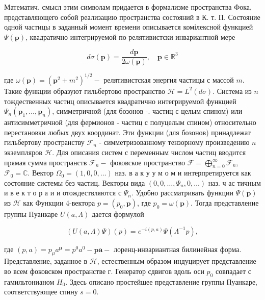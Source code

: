 \documentclass[10pt]{article}
\begin{document}
Математич. смысл этим символам придается в формализме пространства Фока, представляющего собой реализацию пространства состояний в К. т. П. Состояние одной частицы в заданный момент времени описывается комілексной функцией $\Psi(\boldsymbol{p})$, квадратично интегрируемой по релятивистски инвариантной мере



\[

d \sigma(\boldsymbol{p})=\frac{d \boldsymbol{p}}{2 \omega(\boldsymbol{p})}, \quad \boldsymbol{p} \in \mathbb{R}^{3}

\]



где $\omega(\boldsymbol{p})=\left(\boldsymbol{p}^{2}+m^{2}\right)^{1 / 2}-$ релятивистская энергия частицы с массой $m$. Такие функции образуют гильбертово пространство $\mathscr{H}=L^{2}(d \sigma)$. Система из $n$ тождественных частиц описывается квадратично интегрируемой функцией $\Psi_{n}\left(\boldsymbol{p}_{1}, \ldots, \boldsymbol{p}_{n}\right)$, симметричной (для бозонов -. частиц с целым спином) или антисимметричной (для фермионов - частиц с полуцелым спином) относительно перестановки любых двух координат. Эти функции (для бозонов) принадлежат гильбертову пространству $\mathscr{F}_{n}$ - симметризованному тензорному произведению $n$ экземпляров $\mathscr{H}$. Для описания систем с переменным числом частиц вводится прямая сумма пространств $\mathscr{F}_{n}-$ фоковское пространство $\mathscr{F}=\bigoplus_{n=0}^{\infty} \mathscr{F}_{n}$, $\mathscr{F}_{0}=\mathbb{C}$. Вектор $\Omega_{0}=(1,0,0, \ldots)$ наз. в а к у у м о м и интерпретируется как состояние системы без частиц. Векторы вида $\left(0,0, \ldots, \Psi_{n}, 0, \ldots\right)$ наз. ч ас тичным и в е к т о р а и и отождествляются с $\Psi_{n}$. Удобно рассматривать функции $\Psi(\boldsymbol{p})$ из $\mathscr{H}$ как Функции 4-вектора $p=\left(p_{0}, \boldsymbol{p}\right)$, где $p_{0}=\omega(\boldsymbol{p})$. Тогда представление группы Пуанкаре $U(a, \Lambda)$ дается формулой



\[

(U(a, \Lambda) \Psi)(p)=e^{-i(p, a)} \Psi\left(\Lambda^{-1} p\right),

\]



где $(p, a)=p_{\mu} a^{\boldsymbol{\mu}}=p^{0} a^{0}-\boldsymbol{p} \boldsymbol{a}-$ лоренц-инвариантная билинейная форма. Представление, заданное в $\mathscr{H}$, естественным образом индуцирует представление во всем фоковском пространстве г. Генератор сдвигов вдоль оси $p_{0}$ совпадает с гамильтонианом $H_{0}$. Здесь описано простейшее представление группы Пуанкаре, соответствующее спину $s=0$.
\end{document}

